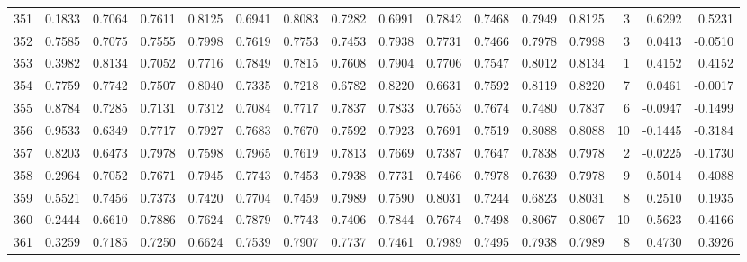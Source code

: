 \begin{tabular}{lrrrrrrrrrrrrrrr}
351 &      0.1833 &  0.7064 &  0.7611 &  0.8125 &  0.6941 &  0.8083 &  0.7282 &  0.6991 &  0.7842 &  0.7468 &   0.7949 &     0.8125 &      3 &                    0.6292 &                     0.5231 \\
352 &      0.7585 &  0.7075 &  0.7555 &  0.7998 &  0.7619 &  0.7753 &  0.7453 &  0.7938 &  0.7731 &  0.7466 &   0.7978 &     0.7998 &      3 &                    0.0413 &                    -0.0510 \\
353 &      0.3982 &  0.8134 &  0.7052 &  0.7716 &  0.7849 &  0.7815 &  0.7608 &  0.7904 &  0.7706 &  0.7547 &   0.8012 &     0.8134 &      1 &                    0.4152 &                     0.4152 \\
354 &      0.7759 &  0.7742 &  0.7507 &  0.8040 &  0.7335 &  0.7218 &  0.6782 &  0.8220 &  0.6631 &  0.7592 &   0.8119 &     0.8220 &      7 &                    0.0461 &                    -0.0017 \\
355 &      0.8784 &  0.7285 &  0.7131 &  0.7312 &  0.7084 &  0.7717 &  0.7837 &  0.7833 &  0.7653 &  0.7674 &   0.7480 &     0.7837 &      6 &                   -0.0947 &                    -0.1499 \\
356 &      0.9533 &  0.6349 &  0.7717 &  0.7927 &  0.7683 &  0.7670 &  0.7592 &  0.7923 &  0.7691 &  0.7519 &   0.8088 &     0.8088 &     10 &                   -0.1445 &                    -0.3184 \\
357 &      0.8203 &  0.6473 &  0.7978 &  0.7598 &  0.7965 &  0.7619 &  0.7813 &  0.7669 &  0.7387 &  0.7647 &   0.7838 &     0.7978 &      2 &                   -0.0225 &                    -0.1730 \\
358 &      0.2964 &  0.7052 &  0.7671 &  0.7945 &  0.7743 &  0.7453 &  0.7938 &  0.7731 &  0.7466 &  0.7978 &   0.7639 &     0.7978 &      9 &                    0.5014 &                     0.4088 \\
359 &      0.5521 &  0.7456 &  0.7373 &  0.7420 &  0.7704 &  0.7459 &  0.7989 &  0.7590 &  0.8031 &  0.7244 &   0.6823 &     0.8031 &      8 &                    0.2510 &                     0.1935 \\
360 &      0.2444 &  0.6610 &  0.7886 &  0.7624 &  0.7879 &  0.7743 &  0.7406 &  0.7844 &  0.7674 &  0.7498 &   0.8067 &     0.8067 &     10 &                    0.5623 &                     0.4166 \\
361 &      0.3259 &  0.7185 &  0.7250 &  0.6624 &  0.7539 &  0.7907 &  0.7737 &  0.7461 &  0.7989 &  0.7495 &   0.7938 &     0.7989 &      8 &                    0.4730 &                     0.3926 \\

\end{tabular}
